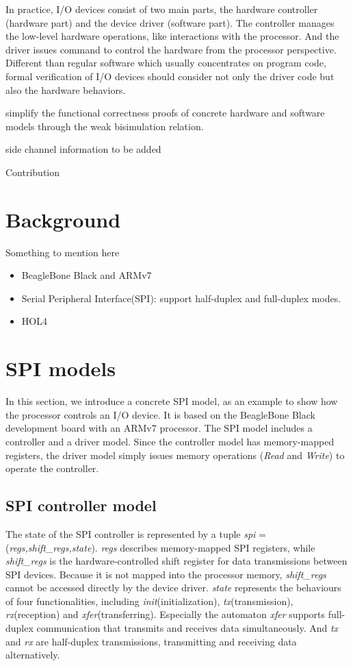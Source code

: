 \documentclass[runningheads]{llncs}
\begin{document}
 In practice, I/O devices consist of two main parts, the hardware controller (hardware part) and the device driver (software part). The controller manages the low-level hardware operations, like interactions with the processor. And the driver issues command to control the hardware from the processor perspective. Different than regular software which usually concentrates on program code, formal verification of I/O devices should consider not only the driver code but also the hardware behaviors.   
 
 simplify the functional correctness proofs of concrete hardware and software models through the weak bisimulation relation.

side channel information to be added

Contribution

\section{Background}

Something to mention here
\begin{itemize}
    \item BeagleBone Black and ARMv7
    \item Serial Peripheral Interface(SPI): support half-duplex and full-duplex modes.
    \item HOL4
\end{itemize}
    
\section{SPI models}
In this section, we introduce a concrete SPI model, as an example to show how the processor controls an I/O device. 
It is based on the BeagleBone Black development board with an ARMv7 processor. 
The SPI model includes a controller and a driver model. 
Since the controller model has memory-mapped registers, the driver model simply issues memory operations (\textit{Read} and \textit{Write}) to operate the controller.

\subsection{SPI controller model}
The state of the SPI controller is represented by a tuple \textit{spi} = (\textit{regs,shift\_regs,state}).
\textit{regs} describes memory-mapped SPI registers, while \textit{shift\_regs} is the hardware-controlled shift register for data transmissions between SPI devices.
Because it is not mapped into the processor memory, \textit{shift\_regs} cannot be accessed directly by the device driver. 
\textit{state} represents the behaviours of four functionalities, including \textit{init}(initialization), \textit{tx}(transmission), \textit{rx}(reception) and \textit{xfer}(transferring). 
Especially the automaton \textit{xfer} supports full-duplex communication that transmits and receives data simultaneously.
And \textit{tx} and \textit{rx} are half-duplex transmissions, transmitting and receiving data alternatively.
\end{document}
